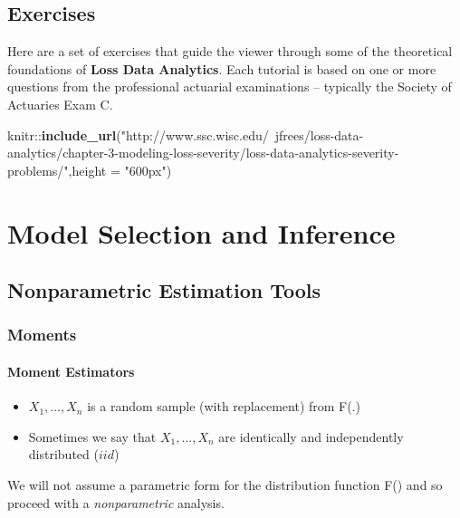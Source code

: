 \documentclass[]{book}
\newenvironment{Shaded}{\begin{snugshade}}{\end{snugshade}}
\newcommand{\KeywordTok}[1]{\textcolor[rgb]{0.13,0.29,0.53}{\textbf{{#1}}}}
\newcommand{\DataTypeTok}[1]{\textcolor[rgb]{0.13,0.29,0.53}{{#1}}}
\newcommand{\StringTok}[1]{\textcolor[rgb]{0.31,0.60,0.02}{{#1}}}
\newcommand{\NormalTok}[1]{{#1}}
\begin{document}
\section{Exercises}\label{exercises-1}

Here are a set of exercises that guide the viewer through some of the
theoretical foundations of \textbf{Loss Data Analytics}. Each tutorial
is based on one or more questions from the professional actuarial
examinations -- typically the Society of Actuaries Exam C.

\begin{Shaded}
\begin{Highlighting}[]
\NormalTok{knitr::}\KeywordTok{include_url}\NormalTok{(}\StringTok{"http://www.ssc.wisc.edu/~jfrees/loss-data-analytics/chapter-3-modeling-loss-severity/loss-data-analytics-severity-problems/"}\NormalTok{,}\DataTypeTok{height =} \StringTok{"600px"}\NormalTok{)}
\end{Highlighting}
\end{Shaded}

\chapter{Model Selection and
Inference}\label{model-selection-and-inference}

\section{Nonparametric Estimation Tools}\label{S:NonParTools}

\subsection{Moments}\label{moments-1}

\subsubsection{Moment Estimators}\label{moment-estimators}

\begin{itemize}
\item
  \(X_1, \ldots, X_n\) is a random sample (with replacement) from F(.)
\item
  Sometimes we say that \(X_1, \ldots, X_n\) are identically and
  independently distributed (\(iid\))
\end{itemize}

We will not assume a parametric form for the distribution function F()
and so proceed with a \emph{nonparametric} analysis.
\end{document}
